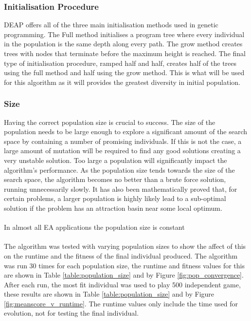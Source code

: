 \documentclass{article}
\begin{document}
\subsubsection{Initialisation Procedure}
DEAP offers all of the three main initialisation methods used in genetic programming. The Full method initialises a program tree where every individual in the population is the same depth along every path. The grow method creates trees with nodes that terminate before the maximum height is reached. The final type of initialisation procedure, ramped half and half, creates half of the trees using the full method and half using the grow method. This is what will be used for this algorithm as it will provides the greatest diversity in initial population.

\subsubsection{Size}
\label{population_size}
Having the correct population size is crucial to success\cite{dynamic_population_size}. The size of the population needs to be large enough to explore a significant amount of the search space by containing a number of promising individuals. If this is not the case, a large amount of mutation will be required to find any good solutions creating a very unstable solution. Too large a population will significantly impact the algorithm's performance. As the population size tends towards the size of the search space, the algorithm becomes no better than a brute force solution, running unnecessarily slowly. It has also been mathematically proved that, for certain problems, a larger population is highly likely lead to a sub-optimal solution if the problem has an attraction basin near some local optimum\cite{unhelpful_large_populations}.
\\\\
In almost all EA applications the population size is constant\cite[p. 20]{textbook}
\\\\
The algorithm was tested with varying population sizes to show the affect of this on the runtime and the fitness of the final individual produced. The algorithm was run 30 times for each population size, the runtime and fitness values for this are shown in Table \ref{table:population_size} and by Figure \ref{fig:pop_convergence}. After each run, the most fit individual was used to play 500 independent game, these results are shown in Table \ref{table:population_size} and by Figure \ref{fig:meanscore_v_runtime}. The runtime values only include the time used for evolution, not for testing the final individual.
\end{document}
